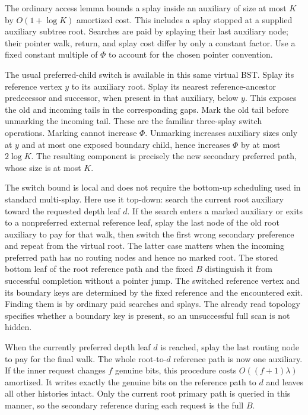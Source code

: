 \documentclass[11pt]{article}
\begin{document}
The ordinary access lemma bounds a splay inside an auxiliary of size
at most $K$ by $O(1+\log K)$ amortized cost. This includes a splay
stopped at a supplied auxiliary subtree root. Searches are paid by
splaying their last auxiliary node; their pointer walk, return, and
splay cost differ by only a constant factor. Use a fixed constant
multiple of $\Phi$ to account for the chosen pointer convention.

The usual preferred-child switch is available in this same virtual
BST. Splay its reference vertex $y$ to its auxiliary root. Splay its
nearest reference-ancestor predecessor and successor, when present
in that auxiliary, below $y$. This exposes the old and incoming
tails in the corresponding gaps. Mark the old tail before unmarking
the incoming tail. These are the familiar three-splay switch operations.
Marking cannot increase $\Phi$. Unmarking increases auxiliary sizes
only at $y$ and at most one exposed boundary child, hence increases
$\Phi$ by at most $2\log K$. The resulting component is precisely
the new secondary preferred path, whose size is at most $K$.

The switch bound is local and does not require the bottom-up scheduling
used in standard multi-splay. Here use it top-down: search the current
root auxiliary toward the requested depth leaf $d$. If the search
enters a marked auxiliary or exits to a nonpreferred external reference
leaf, splay the last node of the old root auxiliary to pay for that
walk, then switch the first wrong secondary preference and repeat
from the virtual root. The latter case matters when the incoming
preferred path has no routing nodes and hence no marked root. The
stored bottom leaf of the root reference path and the fixed $B$
distinguish it from successful completion without a pointer jump.
The switched reference
vertex and its boundary keys are determined by the fixed reference
and the encountered exit. Finding them is by ordinary paid searches
and splays. The already read topology specifies whether a boundary
key is present, so an unsuccessful full scan is not hidden.

When the currently preferred depth leaf $d$ is reached, splay the last
routing node to pay for the final walk. The whole root-to-$d$ reference path is now one
auxiliary. If the inner request changes $f$ genuine bits, this procedure
costs $O((f+1)\lambda)$ amortized. It writes exactly the genuine bits
on the reference path to $d$ and leaves all other histories intact.
Only the current root primary path is queried in this manner, so the
secondary reference during each request is the full $B$.
\end{document}
